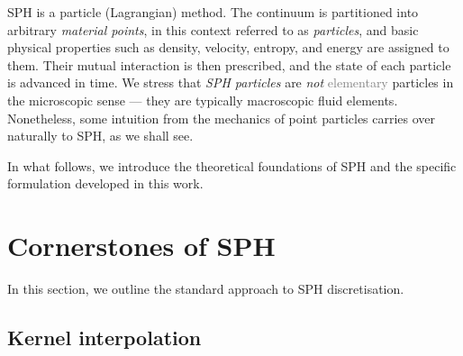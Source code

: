 \documentclass[../main.tex]{subfiles}
\begin{document}
SPH is a particle (Lagrangian) method.   The continuum is partitioned into arbitrary \emph{material points}, in this context referred to as \emph{particles}, and basic physical properties such as density, velocity, entropy, and energy are assigned to them. Their mutual interaction is then prescribed, and the state of each particle is advanced in time. 
We stress that \emph{SPH particles} are \emph{not} \textcolor{gray}{elementary} particles in the microscopic sense --- they are typically macroscopic fluid elements. Nonetheless, some intuition from the mechanics of point particles carries over naturally to SPH, as we shall see.

In what follows, we introduce the theoretical foundations of SPH and the specific formulation developed in this work.

\section{Cornerstones of SPH}
\label{sec:CORNERSTONES}

In this section, we outline the standard approach to SPH discretisation.

\subsection{Kernel interpolation}
\label{sec:INTERPOLATION}
\end{document}
